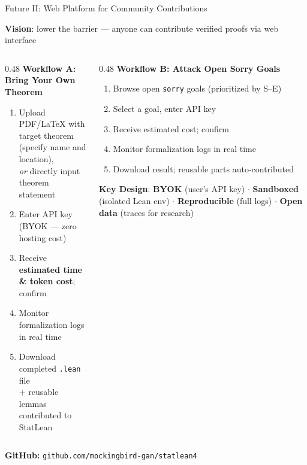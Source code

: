 \documentclass[aspectratio=169, 10pt]{beamer}
\begin{document}
\begin{frame}{Future II: Web Platform for Community Contributions}

\textbf{Vision}: lower the barrier --- anyone can contribute verified proofs via web interface

\vspace{0.2em}
{\small
\begin{columns}[T]
\begin{column}{0.48\textwidth}
\textbf{Workflow A: Bring Your Own Theorem}
\begin{enumerate}
  \item Upload PDF/LaTeX with target theorem\\
        (specify name and location),\\
        \emph{or} directly input theorem statement
  \item Enter API key (BYOK --- zero hosting cost)
  \item Receive \textbf{estimated time \& token cost}; confirm
  \item Monitor formalization logs in real time
  \item Download completed \texttt{.lean} file\\
        + reusable lemmas contributed to StatLean
\end{enumerate}
\end{column}
\begin{column}{0.48\textwidth}
\textbf{Workflow B: Attack Open Sorry Goals}
\begin{enumerate}
  \item Browse open \texttt{sorry} goals (prioritized by S--E)
  \item Select a goal, enter API key
  \item Receive estimated cost; confirm
  \item Monitor formalization logs in real time
  \item Download result; reusable parts auto-contributed
\end{enumerate}

\vspace{0.2em}
\textbf{Key Design}: \textbf{BYOK} (user's API key) $\cdot$ \textbf{Sandboxed} (isolated Lean env) $\cdot$ \textbf{Reproducible} (full logs) $\cdot$ \textbf{Open data} (traces for research)
\end{column}
\end{columns}
}

\begin{center}
{\small \textbf{GitHub:} \texttt{github.com/mockingbird-gan/statlean4}}
\end{center}

\end{frame}
\end{document}
